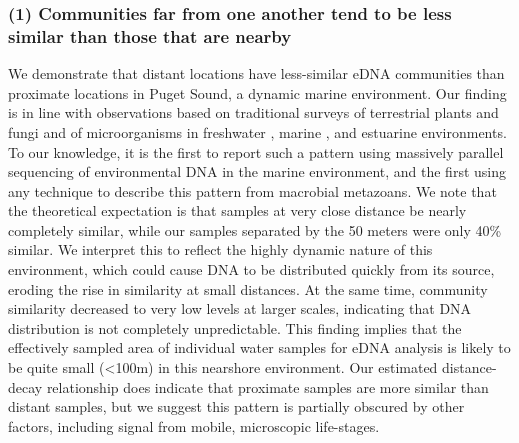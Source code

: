 \documentclass[11pt,letterpaper]{article} %
\begin{document}
\subsubsection*{(1) Communities far from one another tend to be less similar than those that are nearby}
We demonstrate that distant locations have less-similar eDNA communities than proximate locations in Puget Sound, a dynamic marine environment. Our finding is in line with observations based on traditional surveys of terrestrial plants and fungi \citep{Nekola1999, Bahram2013, Condit2002, Chust2006} and of microorganisms in freshwater \citep{Wetzel2012}, marine \citep{Chust2013}, and estuarine \citep{Martiny2011} environments. To our knowledge, it is the first to report such a pattern using massively parallel sequencing of environmental DNA in the marine environment, and the first using any technique to describe this pattern from macrobial metazoans. We note that the theoretical expectation is that samples at very close distance be nearly completely similar, while our samples separated by the 50 meters were only 40\% similar. We interpret this to reflect the highly dynamic nature of this environment, which could cause DNA to be distributed quickly from its source, eroding the rise in similarity at small distances. At the same time, community similarity decreased to very low levels at larger scales, indicating that DNA distribution is not completely unpredictable. This finding implies that the effectively sampled area of individual water samples for eDNA analysis is likely to be quite small (<100m) in this nearshore environment. Our estimated distance-decay relationship does indicate that proximate samples are more similar than distant samples, but we suggest this pattern is partially obscured by other factors, including signal from mobile, microscopic life-stages.
\end{document}
